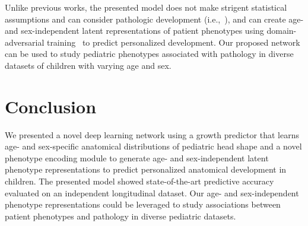 \documentclass[conference]{IEEEtran}
\begin{document}
Unlike previous works, the presented model does not make strigent statistical assumptions and can consider pathologic development (i.e.,~\cite{Porras2022Predictive,Liu2022Data-driven}), and can create age- and sex-independent latent representations of patient phenotypes using domain-adversarial training~\cite{Ganin2016Domain-Adversarial} to predict personalized development. Our proposed network can be used to study pediatric phenotypes associated with pathology in diverse datasets of children with varying age and sex.
\section{Conclusion}
We presented a novel deep learning network using a growth predictor that learns age- and sex-specific anatomical distributions of pediatric head shape and a novel phenotype encoding module to generate age- and sex-independent latent phenotype representations to predict personalized anatomical development in children. The presented model showed state-of-the-art predictive accuracy evaluated on an independent longitudinal dataset. Our age- and sex-independent phenotype representations could be leveraged to study associations between patient phenotypes and pathology in diverse pediatric datasets.


\end{document}
